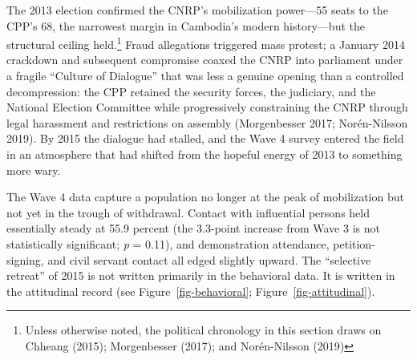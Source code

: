 \documentclass[Review,times,sageh,doublespace]{sagej}
\begin{document}
The 2013 election confirmed the CNRP's mobilization power---55 seats to
the CPP's 68, the narrowest margin in Cambodia's modern history---but
the structural ceiling held.\footnote{Unless otherwise noted, the
  political chronology in this section draws on Chheang (2015);
  Morgenbesser (2017); and Norén-Nilsson (2019)} Fraud allegations
triggered mass protest; a January 2014 crackdown and subsequent
compromise coaxed the CNRP into parliament under a fragile ``Culture of
Dialogue'' that was less a genuine opening than a controlled
decompression: the CPP retained the security forces, the judiciary, and
the National Election Committee while progressively constraining the
CNRP through legal harassment and restrictions on assembly (Morgenbesser
2017; Norén-Nilsson 2019). By 2015 the dialogue had stalled, and the
Wave 4 survey entered the field in an atmosphere that had shifted from
the hopeful energy of 2013 to something more wary.

The Wave 4 data capture a population no longer at the peak of
mobilization but not yet in the trough of withdrawal. Contact with
influential persons held essentially steady at 55.9 percent (the
3.3-point increase from Wave 3 is not statistically significant;
\emph{p} = 0.11), and demonstration attendance, petition-signing, and
civil servant contact all edged slightly upward. The ``selective
retreat'' of 2015 is not written primarily in the behavioral data. It is
written in the attitudinal record (see Figure~\ref{fig-behavioral};
Figure~\ref{fig-attitudinal}).
\end{document}
